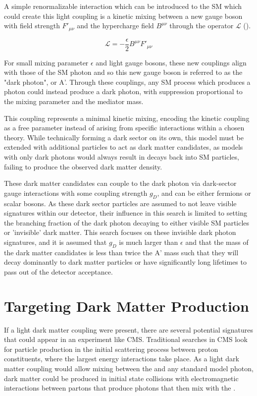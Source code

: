 A simple renormalizable interaction which can be introduced to the SM which could create this light coupling is a kinetic mixing between a new gauge boson with field strength $F'_{\mu\nu}$ and the hypercharge field $B^{\mu\nu}$ through the operator $\mathcal{L}$ (). 

\begin{equation}
	\label{eq:LDMlagrangian}
	\mathcal{L} = - \frac{\epsilon}{2} B^{\mu\nu}F'_{\mu\nu}
\end{equation}

For small mixing parameter $\epsilon$ and light gauge bosons, these new couplings align with those of the SM photon \cite{Bauer_2018} and so this new gauge boson is referred to as the "dark photon", or A'.
Through these couplings, any SM process which produces a photon could instead produce a dark photon, with suppression proportional to the mixing parameter and the mediator mass.

This coupling represents a minimal kinetic mixing, encoding the kinetic coupling as a free parameter instead of arising from specific interactions within a chosen theory. 
While technically forming a dark sector on its own, this model must be extended with additional particles to act as dark matter candidates, as models with only dark photons would always result in decays back into SM particles, failing to produce the observed dark matter density.

These dark matter candidates can couple to the dark photon via dark-sector gauge interactions with some coupling strength $g_D$, and can be either fermions or scalar bosons.
As these dark sector particles are assumed to not leave visible signatures within our detector, their influence in this search is limited to setting the branching fraction of the dark photon decaying to either visible SM particles or 'invisible' dark matter.
This search focuses on these invisible dark photon signatures, and it is assumed that $g_D$ is much larger than $\epsilon$ and that the mass of the dark matter candidates is less than twice the A' mass such that they will decay dominantly to dark matter particles or have significantly long lifetimes to pass out of the detector acceptance.

\section{Targeting Dark Matter Production}
If a light dark matter coupling were present, there are several potential signatures that could appear in an experiment like CMS.
Traditional searches in CMS look for particle production in the initial scattering process between proton constituents, where the largest energy interactions take place.
As a light dark matter coupling would allow mixing between the \aprime and any standard model photon, dark matter could be produced in initial state collisions with electromagnetic interactions between partons that produce photons that then mix with the \aprime.

